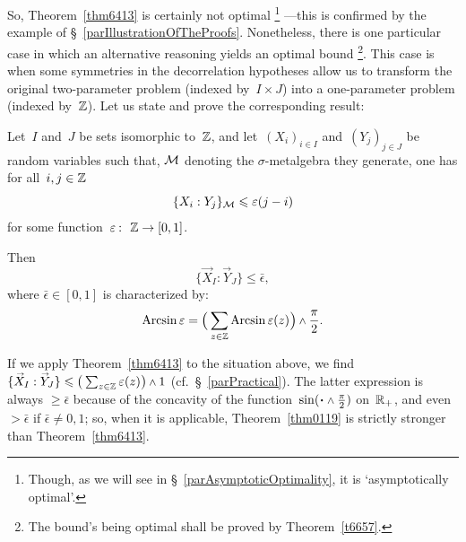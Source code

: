 So, Theorem~\ref{thm6413} is certainly not optimal%
\footnote{Though, as we will see in \S~\ref{parAsymptoticOptimality},
it is `asymptotically optimal'.}%
—this is confirmed by the example of \S~\ref{parIllustrationOfTheProofs}.
Nonetheless, there is one particular case in which
an alternative reasoning yields an optimal bound%
\footnote{The bound's being optimal shall be proved by Theorem~\ref{t6657}.}.
This case is when some symmetries in the decorrelation hypotheses
allow us to transform the original two-parameter problem (indexed by~$I\times J$)
into a one-parameter problem (indexed by~$\mathbb{Z}$).
Let us state and prove the corresponding result:
%
\begin{Thm}\label{thm0119}
Let~$I$ and~$J$ be sets isomorphic to~$\mathbb{Z}$,
and let~$(X_i)_{i\in I}$ and~$(Y_j)_{j\in J}$ be random variables
such that, $\mathcal{M}$ denoting the $\sigma$-metalgebra they generate,
one has for all~$i,j\in\mathbb{Z}$
\[ \{X_i : Y_j\}_{\mathcal{M}} \leqslant \varepsilon(j-i) \]
for some function~$\epsilon \colon \ZZ \to [0,1]$.

Then
\[ \big\{ \vec{X}_I : \vec{Y}_J \big\} \leq \bar{\epsilon} ,\]
where $\bar{\epsilon} \in [0,1]$ is characterized by:
\[\label{f6444} \arcsin \bar{\epsilon} =
\Big( \sum_{z\in\ZZ} \arcsin \epsilon(z) \Big) \wedge \frac{\pi}{2} .\]
\end{Thm}

\begin{Rmk}
If we apply Theorem~\ref{thm6413} to the situation above, we find
${\{\vec{X}_I:\vec{Y}_J\}} \ab \leq \big( \sum_{z\in\ZZ}\epsilon(z) \big) \wedge 1$
(cf.\ \S~\ref{parPractical}).
The latter expression is always $\geq \bar{\epsilon}$
because of the concavity of the function~$\sin(\Bcdot\wedge\frac{\pi}{2})$ on~$\mathbb{R}_+$,
and even $>\bar\epsilon$ if $\bar{\epsilon}\neq0,1$;
so, when it is applicable, Theorem~\ref{thm0119} is strictly stronger than Theorem~\ref{thm6413}.
\end{Rmk}

